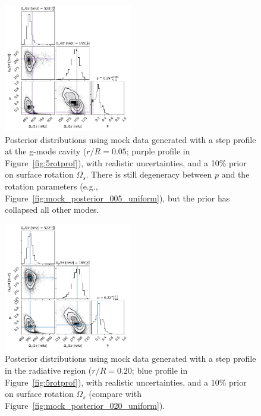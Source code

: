 \begin{figure}
\centering
    \includegraphics[width=0.5\textwidth]{Figures/subgiant_chapter_figures/20.05_corner.png}
    \caption{Posterior distributions using mock data generated with a step profile at the g-mode cavity ($r/R = 0.05$; purple profile in Figure~\ref{fig:5rotprof}), with realistic uncertainties, and a 10\% prior on surface rotation $\Omega_s$. There is still degeneracy between $p$ and the rotation parameters (e.g., Figure~\ref{fig:mock_posterior_005_uniform}), but the prior has collapsed all other modes.}
    \label{fig:mock_posterior_005_reject}
\end{figure}

\begin{figure}
\centering
    \includegraphics[width=0.5\textwidth]{Figures/subgiant_chapter_figures/20.2_corner.png}
    \caption{Posterior distributions using mock data generated with a step profile in the radiative region ($r/R = 0.20$; blue profile in Figure~\ref{fig:5rotprof}), with realistic uncertainties, and a 10\% prior on surface rotation $\Omega_s$ (compare with Figure~\ref{fig:mock_posterior_020_uniform}).}
    \label{fig:mock_posterior_020_reject}
\end{figure}

